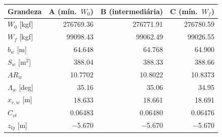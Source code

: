 \begin{tabular}{lrrr}
\toprule
Grandeza & A (mín.\ $W_0$) & B (intermediária) & C (mín.\ $W_f$) \\
\midrule
$W_0$ [kgf] & 276769.36 & 276771.91 & 276780.59 \\
$W_f$ [kgf] & 99098.43 & 99062.49 & 99026.55 \\
$b_w$ [m] & 64.648 & 64.768 & 64.900 \\
$S_w$ [m$^2$] & 388.04 & 388.33 & 388.66 \\
$AR_w$ & 10.7702 & 10.8022 & 10.8373 \\
$\Lambda_w$ [deg] & 35.16 & 35.06 & 34.95 \\
$x_{r,w}$ [m] & 18.633 & 18.661 & 18.691 \\
$C_{vt}$ & 0.06483 & 0.06480 & 0.06476 \\
$z_{lg}$ [m] & $-$5.670 & $-$5.670 & $-$5.670 \\
\bottomrule
\end{tabular}
